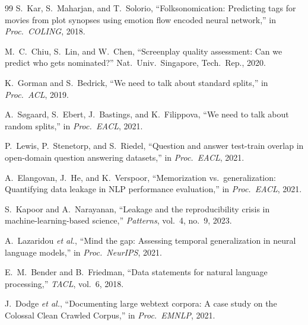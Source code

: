 \documentclass[conference,a4paper]{IEEEtran}
\begin{document}
\begin{thebibliography}{99}
S.~Kar, S.~Maharjan, and T.~Solorio, ``Folksonomication: Predicting tags
for movies from plot synopses using emotion flow encoded neural
network,'' in \emph{Proc.\ COLING}, 2018.

M.~C.~Chiu, S.~Lin, and W.~Chen, ``Screenplay quality assessment: Can we
predict who gets nominated?'' Nat.\ Univ.\ Singapore, Tech.\ Rep., 2020.

K.~Gorman and S.~Bedrick, ``We need to talk about standard splits,'' in
\emph{Proc.\ ACL}, 2019.

A.~S{\o}gaard, S.~Ebert, J.~Bastings, and K.~Filippova, ``We need to
talk about random splits,'' in \emph{Proc.\ EACL}, 2021.

P.~Lewis, P.~Stenetorp, and S.~Riedel, ``Question and answer test-train
overlap in open-domain question answering datasets,'' in \emph{Proc.\
EACL}, 2021.

A.~Elangovan, J.~He, and K.~Verspoor, ``Memorization vs.\
generalization: Quantifying data leakage in NLP performance
evaluation,'' in \emph{Proc.\ EACL}, 2021.

S.~Kapoor and A.~Narayanan, ``Leakage and the reproducibility crisis in
machine-learning-based science,'' \emph{Patterns}, vol.~4, no.~9, 2023.

\bibitem{lazaridou2021}
A.~Lazaridou \emph{et al.}, ``Mind the gap: Assessing temporal
generalization in neural language models,'' in \emph{Proc.\ NeurIPS},
2021.

E.~M.~Bender and B.~Friedman, ``Data statements for natural language
processing,'' \emph{TACL}, vol.~6, 2018.

J.~Dodge \emph{et al.}, ``Documenting large webtext corpora: A case
study on the Colossal Clean Crawled Corpus,'' in \emph{Proc.\ EMNLP},
2021.

\end{thebibliography}
\end{document}
